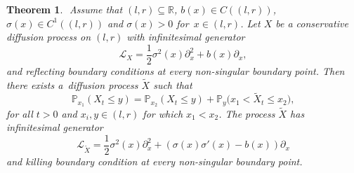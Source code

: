 \documentclass[pdftex]{sigma}
\numberwithin{equation}{section}
\newtheorem{Theorem}{Theorem}[section]
\theoremstyle{definition}
\def\L{{\mathcal L}}
\def\p{{\mathbb P}}
\def\r{{\mathbb R}}
\begin{document}
\begin{Theorem}\label{thm:main}${}$
Assume that $(l,r) \subseteq \r$, $b(x) \in C((l,r))$, $\sigma(x)\in C^1((l,r))$ and $\sigma(x)>0$ for~${x \in (l,r)}$. Let $X$ be a conservative diffusion process on $(l,r)$ with infinitesimal generator
 \[
 \L_X=\frac{1}{2} \sigma^2(x) \partial_x^2+b(x) \partial_x,
 \]
 and reflecting boundary conditions at every non-singular boundary point. Then there exists a~diffusion process $\widetilde X$ such that
\begin{equation}\label{eqn:main}
\p_{x_1}(X_t\le y)=\p_{x_2}(X_t\le y)+\p_y\bigl(x_1<\widetilde X_t \le x_2\bigr),
\end{equation}
for all $t>0$ and $x_i,y \in (l,r)$ for which $x_1<x_2$. The process $\widetilde X$ has infinitesimal generator
\begin{equation}\label{def_tilde_L2}
\L_{\widetilde X}=\frac{1}{2} \sigma^2(x) \partial_x^2+(\sigma(x)\sigma'(x) - b(x) )\partial_x
\end{equation}
and killing boundary condition at every non-singular boundary point.
\end{Theorem}
\end{document}
